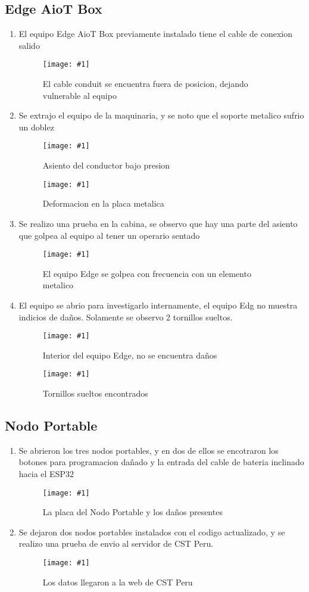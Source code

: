 \documentclass{article}
\newcommand{\vputfigure}[3]{%
  \begin{figure}[H]
    \centering
    \texttt{[image: \#1]}
    \captionsetup{font=scriptsize}
    \caption{#2}
    \label{#3}
  \end{figure}%
}
\newcommand{\hputfigure}[3]{%
  \begin{figure}[H]
    \centering
    \texttt{[image: \#1]}
    \captionsetup{font=scriptsize}
    \caption{#2}
    \label{#3}
  \end{figure}%
}
\begin{document}
\subsection{Edge AioT Box}
  \begin{enumerate}
    \renewcommand{\labelenumi}{(\roman{enumi})}
    \item El equipo Edge AioT Box previamente instalado tiene el cable de conexion salido
    \hputfigure{pictures/Edge_R1600H_cable_conduit_error.jpg}
                {El cable conduit se encuentra fuera de posicion, dejando vulnerable al equipo}
                {fig:edge_fail_conduit}
    
    \item Se extrajo el equipo de la maquinaria, y se noto que el soporte metalico sufrio un doblez
    \hputfigure{pictures/Edge_R1600H_asiento_alto.jpg}
                {Asiento del conductor bajo presion}
                {fig:asiento_r1600h}
    \hputfigure{pictures/Edge_R1600H_Placa_deformada.jpg}
                {Deformacion en la placa metalica}
                {fig:edge_soporte_steel}

    \item Se realizo una prueba en la cabina, se observo que hay una parte del asiento que golpea al equipo al tener un operario sentado
    \hputfigure{pictures/Edge_R1600H_choque_con_asiento.jpg}
                {El equipo Edge se golpea con frecuencia con un elemento metalico}
                {fig:edge_hit_steel}

    \item El equipo se abrio para investigarlo internamente, el equipo Edg no muestra indicios de daños. Solamente se observo 2 tornillos
    sueltos. 
    \vputfigure{pictures/Edge_R1600H_estado_inicial_interior.jpg}
                {Interior del equipo Edge, no se encuentra daños}
                {fig:inside_edge}
    \vputfigure{pictures/Edge_R1600H_tornillos_salidos.jpg}
                {Tornillos sueltos encontrados}
                {fig:bolt_2_edge}
  \end{enumerate}

\subsection{Nodo Portable}
  \begin{enumerate}
    \renewcommand{\labelenumi}{(\roman{enumi})}
    \item Se abrieron los tres nodos portables, y en dos de ellos se encotraron los botones para programacion 
    dañado y la entrada del cable de bateria inclinado hacia el ESP32
    \hputfigure{pictures/Nodo_Portable_fallos_por_presion.jpg}
                {La placa del Nodo Portable y los daños presentes}
                {fig:nodo_damaged}

    \item Se dejaron dos nodos portables instalados con el codigo actualizado, y se realizo una prueba de envio 
    al servidor de CST Peru.
    \vputfigure{pictures/Nodo_Portable_Pruena_6_Noviembre_300_datos.jpg}
                {Los datos llegaron a la web de CST Peru}
                {fig:nodo_test_cst}
  \end{enumerate}
\end{document}
